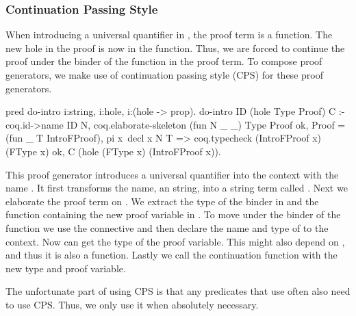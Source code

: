 \documentclass[thesis.tex]{subfiles}
\begin{document}
{{{{\subsubsection{Continuation Passing Style}\label{ssec:cecps}
When introducing a universal quantifier in \coq, the proof term is a function. The new hole in the proof is now in the function. Thus, we are forced to continue the proof under the binder of the function in the proof term. To compose proof generators, we make use of continuation passing style (CPS) for these proof generators.
\begin{elpicode}
  pred do-intro i:string, i:hole, i:(hole -> prop).
  do-intro ID (hole Type Proof) C :-
    coq.id->name ID N,
    coq.elaborate-skeleton (fun N _ _) Type Proof ok,
    Proof = (fun _ T IntroFProof),
    pi x\ decl x N T =>
      coq.typecheck (IntroFProof x) (FType x) ok,
      C (hole (FType x) (IntroFProof x)).
\end{elpicode}
This proof generator introduces a \coq universal quantifier into the \coq context with the name . It first transforms the name, an \elpi string, into a \coq string term called . Next we elaborate the proof term  on . We extract the type of the binder in  and the function containing the new proof variable in . To move under the binder of the function we use the  connective and then declare the name and type of  to the \coq context. Now can get the type of the proof variable. This might also depend on , and thus it is also a function. Lastly we call the continuation function with the new type and proof variable.

The unfortunate part of using CPS is that any predicates that use  often also need to use CPS. Thus, we only use it when absolutely necessary.

}}}}
\end{document}
